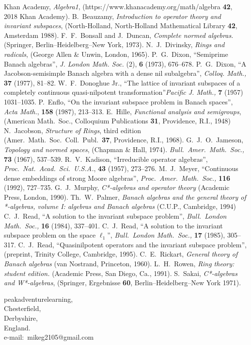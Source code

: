 \documentclass[11pt]{article}
\begin{document}
\begin{thebibliography}{99}
 Khan Academy, {\em Algebra1}, (https://www.khanacademy.org/math/algebra {\bf
42}, 2018 Khan Academy).
 B.~Beauzamy, {\em Introduction to operator theory and
invariant subspaces}, (North-Holland, North-Holland Mathematical Library {\bf
42}, Amsterdam 1988).
 F.~F.~Bonsall and J.~Duncan, {\em Complete normed algebras.}
(Springer, Berlin--Heidelberg--New York, 1973).
 N.~J.~Divinsky, {\em Rings and radicals}, (George Allen
\& Unwin, London, 1965).
  P.~G.~Dixon, ``Semiprime Banach algebras'', {\em J. London Math. Soc.} (2),
{\bf 6} (1973), 676--678.
 P.~G.~Dixon, ``A Jacobson-semisimple Banach algebra with a dense nil
subalgebra'', {\em Colloq. Math.,} {\bf 37} (1977), 81--82.
 W.~F.~Donoghue Jr., ``The lattice of invariant subspaces of
a completely continuous quasi-nilpotent transformation''{\em Pacific J. Math.,} {\bf 7} (1957)
1031--1035.  %
 P.~Enflo, ``On the invariant subspace problem in Banach spaces'',
{\em Acta Math.}, {\bf 158} (1987), 213--313. %
 E.~Hille, {\em Functional analysis and semigroups},
(American Math.\ Soc., Colloquium Publications {\bf 31}, Providence, R.I., 1948)
 N.~Jacobson, {\em Structure of Rings}, third edition
(Amer.\ Math.\ Soc.\ Coll.\ Publ.\ {\bf 37}, Providence, R.I., 1968).
 G.~J.~O.~Jameson, {\em Topology and normed spaces},
(Chapman \& Hall, 1974).
{\em Bull.\ Amer.\ Math.\ Soc.,} {\bf 73} (1967), 537--539. %
 R.~V.~Kadison, ``Irreducible operator algebras'',
{\em Proc.\ Nat.\ Acad.\ Sci.\ U.S.A.}, {\bf 43} (1957), 273--276.
 M.~J.~Meyer, ``Continuous dense embeddings of strong Moore
algebras'', {\em Proc.\ Amer.\ Math.\ Soc.,} {\bf 116} (1992), 727--735.
 G.~J.~Murphy, {\em C*-algebras and operator theory}
(Academic Press, London, 1990).
 Th.~W.~Palmer, {\em Banach algebras and the general theory of *-algebras,
volume I: algebras and Banach algebras} (C.U.P., Cambridge, 1994)
 C.~J.~Read, ``A solution to the invariant subspace problem'',
{\em Bull.\ London Math.\ Soc.,} {\bf 16} (1984), 337--401. %
 C.~J.~Read, ``A solution to the invariant subspace problem
on the space $\ell_1$'', {\em Bull.\ London Math.\ Soc.,} {\bf 17} (1985),
305--317. %
 C.~J.~Read, ``Quasinilpotent operators and the invariant
subspace problem'', (preprint, Trinity College, Cambridge, 1995).
 C.~E.~Rickart, {\em General theory of Banach algebras}
(van Nostrand, Princeton, 1960).
 L.~H.~Rowen, {\em Ring theory: student edition.}
(Academic Press, San Diego, Ca., 1991).
 S.~Sakai, {\em C*-algebras and W*-algebras},
(Springer, Ergebnisse {\bf 60}, Berlin--Heidelberg--New York 1971).
\end{thebibliography}
\vspace{\baselineskip}

\noindent
peakadventurelearning, \\
Chesterfield,\\
Derbyshire,\\
England. \\[1 ex]
e-mail:~mikeg2105@gmail.com
\end{document}
